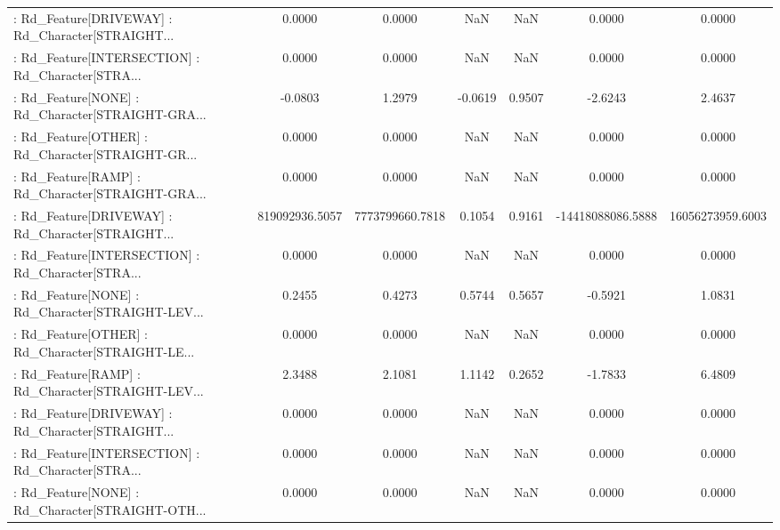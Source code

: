 \begin{longtable}{p{4cm}cccccc}
 : Rd\_Feature[DRIVEWAY] : Rd\_Character[STRAIGHT... &            0.0000 &            0.0000 &     NaN &          NaN &             0.0000 &            0.0000 \\
 : Rd\_Feature[INTERSECTION] : Rd\_Character[STRA... &            0.0000 &            0.0000 &     NaN &          NaN &             0.0000 &            0.0000 \\
 : Rd\_Feature[NONE] : Rd\_Character[STRAIGHT-GRA... &           -0.0803 &            1.2979 & -0.0619 &       0.9507 &            -2.6243 &            2.4637 \\
 : Rd\_Feature[OTHER] : Rd\_Character[STRAIGHT-GR... &            0.0000 &            0.0000 &     NaN &          NaN &             0.0000 &            0.0000 \\
 : Rd\_Feature[RAMP] : Rd\_Character[STRAIGHT-GRA... &            0.0000 &            0.0000 &     NaN &          NaN &             0.0000 &            0.0000 \\
 : Rd\_Feature[DRIVEWAY] : Rd\_Character[STRAIGHT... &    819092936.5057 &   7773799660.7818 &  0.1054 &       0.9161 &  -14418088086.5888 &  16056273959.6003 \\
 : Rd\_Feature[INTERSECTION] : Rd\_Character[STRA... &            0.0000 &            0.0000 &     NaN &          NaN &             0.0000 &            0.0000 \\
 : Rd\_Feature[NONE] : Rd\_Character[STRAIGHT-LEV... &            0.2455 &            0.4273 &  0.5744 &       0.5657 &            -0.5921 &            1.0831 \\
 : Rd\_Feature[OTHER] : Rd\_Character[STRAIGHT-LE... &            0.0000 &            0.0000 &     NaN &          NaN &             0.0000 &            0.0000 \\
 : Rd\_Feature[RAMP] : Rd\_Character[STRAIGHT-LEV... &            2.3488 &            2.1081 &  1.1142 &       0.2652 &            -1.7833 &            6.4809 \\
 : Rd\_Feature[DRIVEWAY] : Rd\_Character[STRAIGHT... &            0.0000 &            0.0000 &     NaN &          NaN &             0.0000 &            0.0000 \\
 : Rd\_Feature[INTERSECTION] : Rd\_Character[STRA... &            0.0000 &            0.0000 &     NaN &          NaN &             0.0000 &            0.0000 \\
 : Rd\_Feature[NONE] : Rd\_Character[STRAIGHT-OTH... &            0.0000 &            0.0000 &     NaN &          NaN &             0.0000 &            0.0000 \\

\end{longtable}
